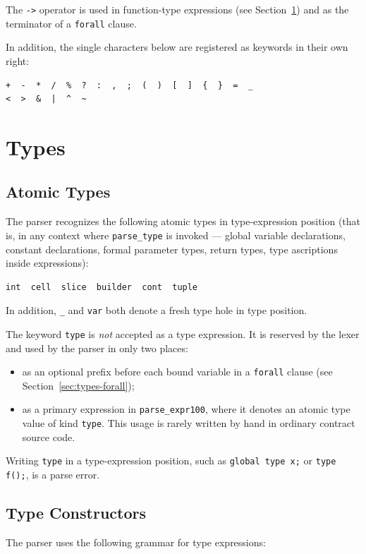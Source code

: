 \documentclass[12pt,oneside]{article}
\begin{document}
The \verb|->| operator is used in function-type expressions (see
Section~\ref{sec:types}) and as the terminator of a \verb|forall| clause.

In addition, the single characters below are registered as keywords in their
own right:

\begin{verbatim}
+  -  *  /  %  ?  :  ,  ;  (  )  [  ]  {  }  =  _
<  >  &  |  ^  ~
\end{verbatim}

\section{Types}
\label{sec:types}
\subsection{Atomic Types}
The parser recognizes the following atomic types in type-expression position
(that is, in any context where \verb|parse_type| is invoked --- global variable
declarations, constant declarations, formal parameter types, return types,
type ascriptions inside expressions):

\begin{verbatim}
int  cell  slice  builder  cont  tuple
\end{verbatim}

In addition, \verb|_| and \verb|var| both denote a fresh type hole in type
position.

The keyword \verb|type| is \emph{not} accepted as a type expression. It is
reserved by the lexer and used by the parser in only two places:

\begin{itemize}
\item as an optional prefix before each bound variable in a \verb|forall|
clause (see Section~\ref{sec:types-forall});
\item as a primary expression in \verb|parse_expr100|, where it denotes an
atomic type value of kind \verb|type|. This usage is rarely written by hand in
ordinary contract source code.
\end{itemize}

Writing \verb|type| in a type-expression position, such as
\verb|global type x;| or \verb|type f();|, is a parse error.

\subsection{Type Constructors}
The parser uses the following grammar for type expressions:
\end{document}
